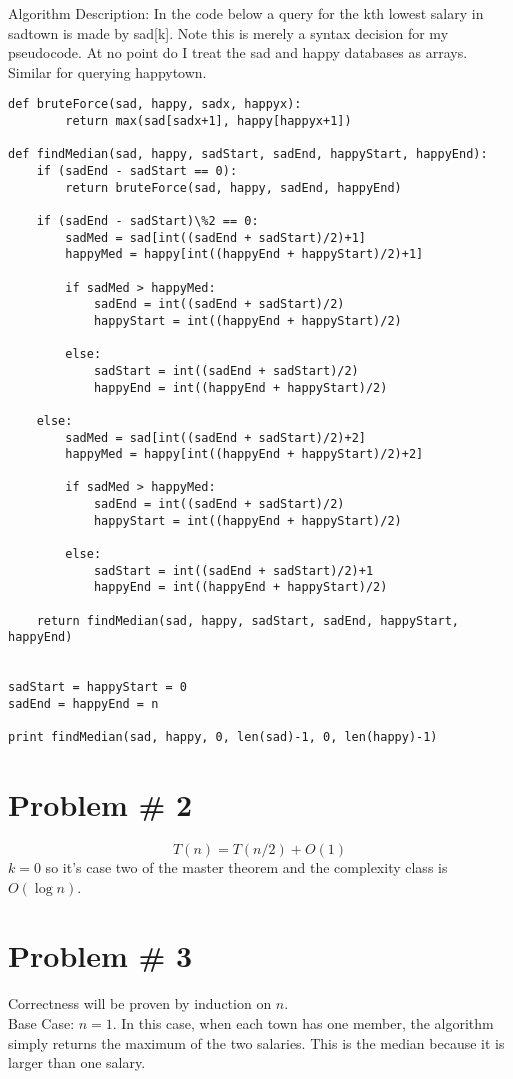 \documentclass{article}
\begin{document}
Algorithm Description:
In the code below a query for the kth lowest salary in sadtown is made by sad[k]. Note this is merely a syntax decision for my pseudocode. At no point do I treat the sad and happy databases as arrays. Similar for querying happytown.
\begin{lstlisting}
def bruteForce(sad, happy, sadx, happyx):
        return max(sad[sadx+1], happy[happyx+1])
            
def findMedian(sad, happy, sadStart, sadEnd, happyStart, happyEnd):
    if (sadEnd - sadStart == 0):
        return bruteForce(sad, happy, sadEnd, happyEnd)

    if (sadEnd - sadStart)\%2 == 0:
        sadMed = sad[int((sadEnd + sadStart)/2)+1]
        happyMed = happy[int((happyEnd + happyStart)/2)+1]
    
        if sadMed > happyMed:
            sadEnd = int((sadEnd + sadStart)/2)
            happyStart = int((happyEnd + happyStart)/2)

        else:
            sadStart = int((sadEnd + sadStart)/2)
            happyEnd = int((happyEnd + happyStart)/2)

    else:
        sadMed = sad[int((sadEnd + sadStart)/2)+2]
        happyMed = happy[int((happyEnd + happyStart)/2)+2]

        if sadMed > happyMed:
            sadEnd = int((sadEnd + sadStart)/2)
            happyStart = int((happyEnd + happyStart)/2)

        else:
            sadStart = int((sadEnd + sadStart)/2)+1
            happyEnd = int((happyEnd + happyStart)/2)

    return findMedian(sad, happy, sadStart, sadEnd, happyStart, happyEnd)


sadStart = happyStart = 0
sadEnd = happyEnd = n

print findMedian(sad, happy, 0, len(sad)-1, 0, len(happy)-1)
\end{lstlisting}

\section*{Problem \# 2}
$$T(n) = T(n/2) + O(1)$$
$k = 0$ so it's case two of the master theorem and the complexity class is $O(\log n)$.

\section*{Problem \# 3}
Correctness will be proven by induction on $n$. \\
Base Case: $n = 1$. In this case, when each town has one member, the algorithm simply returns the maximum of the two salaries. This is the median because it is larger than one salary. \\
\end{document}

